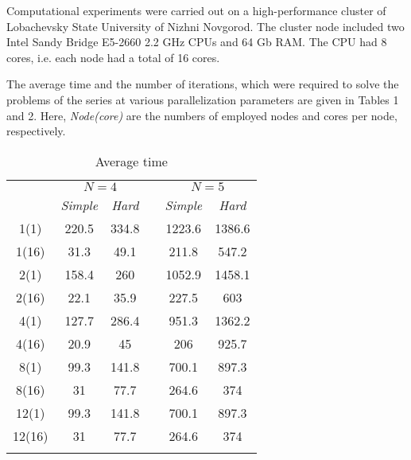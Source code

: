\documentclass[smallextended]{svjour3}       %
\begin{document}
Computational experiments were carried out on a high-performance cluster of Lobachevsky State University of Nizhni Novgorod. The cluster node included two Intel Sandy Bridge E5-2660 2.2 GHz CPUs and 64 Gb RAM. The CPU had 8 cores, i.e. each node had a total of 16 cores.

The average time and the number of iterations, which were required to solve the problems of the series at various parallelization parameters are given in Tables 1 and 2. Here, \textit{Node(core)} are the numbers of employed  nodes and cores per node, respectively.

\begin{table}
	\caption{Average time}
	\label{tab:1}
	\center
	\begin{tabular}{cccccc}
		\hline\noalign{\smallskip}
		\multirow{2}{*}{\textit{Node(core)}} & \multicolumn{2}{c}{ $N=4$ } & & \multicolumn{2}{c}{$N=5$} \\
		\noalign{\smallskip} \cline{2-3} \cline{5-6} \noalign{\smallskip}
		 & \textit{Simple} & \textit{Hard} & & \textit{Simple} & \textit{Hard}  \\
		\noalign{\smallskip} \hline \noalign{\smallskip}
1(1)	&	220.5	&	334.8	&	&	1223.6	&	1386.6	\\
1(16)	&	31.3	&	49.1	&	&	211.8	&	547.2	\\
2(1)	&	158.4	&	260	&	&	1052.9	&	1458.1	\\
2(16)	&	22.1	&	35.9	&	&	227.5	&	603	\\
4(1)	&	127.7	&	286.4	&	&	951.3	&	1362.2	\\
4(16)	&	20.9	&	45	&	&	206	&	925.7	\\
8(1)	&	99.3	&	141.8	&	&	700.1	&	897.3	\\
8(16)	&	31	&	77.7	&	&	264.6	&	374	\\
12(1)	&	99.3	&	141.8	&	&	700.1	&	897.3	\\
12(16)	&	31	&	77.7	&	&	264.6	&	374	\\
		\noalign{\smallskip}\hline
	\end{tabular}
\end{table}
\end{document}
